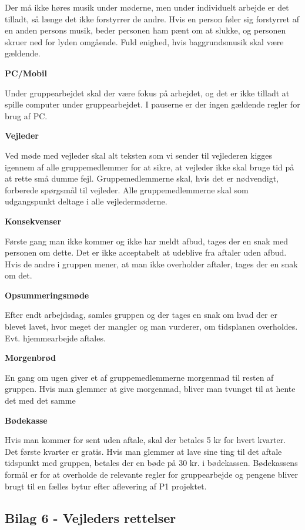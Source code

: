 Der må ikke høres musik under møderne, men under individuelt arbejde er det tilladt, så længe det ikke forstyrrer de andre. Hvis en person føler sig forstyrret af en anden persons musik, beder personen ham pænt om at slukke, og personen skruer ned for lyden omgående. Fuld enighed, hvis baggrundsmusik skal være gældende. 

\textbf{PC/Mobil}

Under gruppearbejdet skal der være fokus på arbejdet, og det er ikke tilladt at spille computer under gruppearbejdet. I pauserne er der ingen gældende regler for brug af PC.

\textbf{Vejleder}

Ved møde med vejleder skal alt teksten som vi sender til vejlederen kigges igennem af alle gruppemedlemmer for at sikre, at vejleder ikke skal bruge tid på at rette små dumme fejl. Gruppemedlemmerne skal, hvis det er nødvendigt, forberede spørgsmål til vejleder. Alle gruppemedlemmerne skal som udgangspunkt deltage i alle vejledermøderne. 

\textbf{Konsekvenser}

Første gang man ikke kommer og ikke har meldt afbud, tages der en snak med personen om dette. Det er ikke acceptabelt at udeblive fra aftaler uden afbud.
Hvis de andre i gruppen mener, at man ikke overholder aftaler, tages der en snak om det.

\textbf{Opsummeringsmøde}

Efter endt arbejdsdag, samles gruppen og der tages en snak om hvad der er blevet lavet, hvor meget der mangler og man vurderer, om tidsplanen overholdes. Evt. hjemmearbejde aftales.

\textbf{Morgenbrød}

En gang om ugen giver et af gruppemedlemmerne morgenmad til resten af gruppen. Hvis man glemmer at give morgenmad, bliver man tvunget til at hente det med det samme

\textbf{Bødekasse}

Hvis man kommer for sent uden aftale, skal der betales 5 kr for hvert kvarter. Det første kvarter er gratis. Hvis man glemmer at lave sine ting til det aftale tidspunkt med gruppen, betales der en bøde på 30 kr. i bødekassen. Bødekassens formål er for at overholde de relevante regler for gruppearbejde og pengene bliver brugt til en fælles bytur efter aflevering af P1 projektet. 

\subsection{Bilag 6 - Vejleders rettelser} \label{sec:Bilag6}

